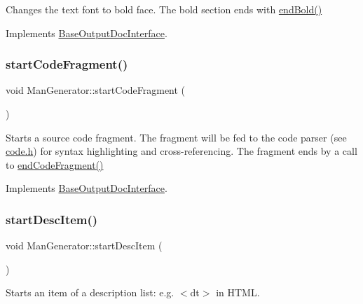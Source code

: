 Changes the text font to bold face. The bold section ends with \mbox{\hyperlink{class_man_generator_acc9e3c928bd473ce079e323f19948dc7}{end\+Bold()}} 

Implements \mbox{\hyperlink{class_base_output_doc_interface_aa0bfe5ef08077a7191ba4666f47c441b}{Base\+Output\+Doc\+Interface}}.

\mbox{\label{class_man_generator_a23377579a34bc5cee9a43885888dd5d4}} 
\subsubsection{\texorpdfstring{startCodeFragment()}{startCodeFragment()}}
{\footnotesize\ttfamily void Man\+Generator\+::start\+Code\+Fragment (\begin{DoxyParamCaption}{ }\end{DoxyParamCaption})\hspace{0.3cm}{\ttfamily [virtual]}}

Starts a source code fragment. The fragment will be fed to the code parser (see \mbox{\hyperlink{code_8h_source}{code.\+h}}) for syntax highlighting and cross-\/referencing. The fragment ends by a call to \mbox{\hyperlink{class_man_generator_a4e825c27561ebb51c155840d9101725a}{end\+Code\+Fragment()}} 

Implements \mbox{\hyperlink{class_base_output_doc_interface_ab19fc767b08c25b0ca7c976d24799bda}{Base\+Output\+Doc\+Interface}}.

\mbox{\label{class_man_generator_a3230aa59d50e8bdbbfb94e56bd956f56}} 
\subsubsection{\texorpdfstring{startDescItem()}{startDescItem()}}
{\footnotesize\ttfamily void Man\+Generator\+::start\+Desc\+Item (\begin{DoxyParamCaption}{ }\end{DoxyParamCaption})\hspace{0.3cm}{\ttfamily [virtual]}}

Starts an item of a description list\+: e.\+g. {\ttfamily $<$dt$>$} in H\+T\+ML. 

